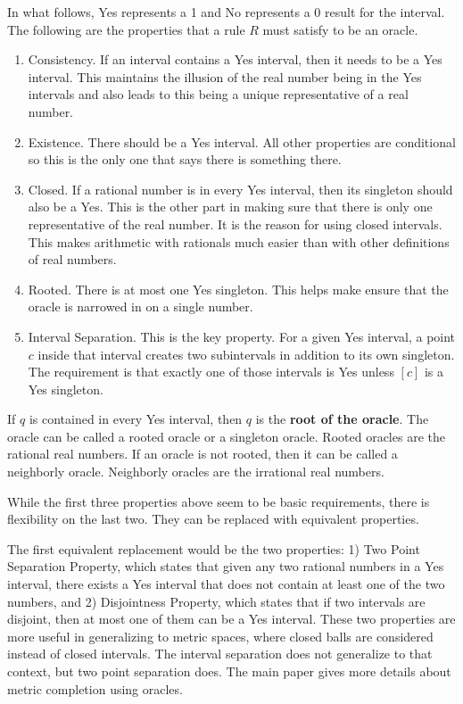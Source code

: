 \documentclass[12pt]{article}
\theoremstyle{remark}
\begin{document}
In what follows, Yes represents a 1 and No represents a 0 result for the interval. The following are the properties that a rule $R$ must satisfy to be an oracle. 

\begin{enumerate}
    \item Consistency. If an interval contains a Yes interval, then it needs to be a Yes interval. This maintains the illusion of the real number being in the Yes intervals and also leads to this being a unique representative of a real number. 
    \item Existence. There should be a Yes interval. All other properties are conditional so this is the only one that says there is something there. 
    \item Closed. If a rational number is in every Yes interval, then its singleton should also be a Yes. This is the other part in making sure that there is only one representative of the real number. It is the reason for using closed intervals. This makes arithmetic with rationals much easier than with other definitions of real numbers.
    \item Rooted. There is at most one Yes singleton.  This helps make ensure that the oracle is narrowed in on a single number. 
    \item Interval Separation. This is the key property. For a given Yes interval, a point $c$ inside that interval creates two subintervals in addition to its own singleton. The requirement is that exactly one of those intervals is Yes unless $[c]$ is a Yes singleton. 
\end{enumerate}

If $q$ is contained in every Yes interval, then $q$ is the \textbf{root of the oracle}.  The oracle can be called a rooted oracle or a singleton oracle. Rooted oracles are the rational real numbers. If an oracle is not rooted, then it can be called a neighborly oracle. Neighborly oracles are the irrational real numbers. 

While the first three properties above seem to be basic requirements, there is flexibility on the last two. They can be replaced with equivalent properties.

The first equivalent replacement would be the two properties: 1) Two Point Separation Property, which states that given any two rational numbers in a Yes interval, there exists a Yes interval that does not contain at least one of the two numbers, and 2) Disjointness Property, which states that if two intervals are disjoint, then at most one of them can be a Yes interval. These two properties are more useful in generalizing to metric spaces, where closed balls are considered instead of closed intervals. The interval separation does not generalize to that context, but two point separation does. The main paper gives more details about metric completion using oracles. 
\end{document}
